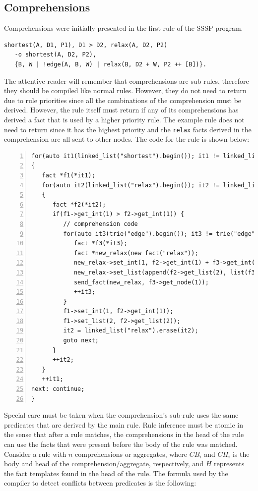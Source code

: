 \subsection{Comprehensions}

Comprehensions were initially presented in the first rule of the SSSP program.

\begin{Verbatim}
shortest(A, D1, P1), D1 > D2, relax(A, D2, P2)
   -o shortest(A, D2, P2),
   {B, W | !edge(A, B, W) | relax(B, D2 + W, P2 ++ [B])}.
\end{Verbatim}

The attentive reader will remember that comprehensions are sub-rules, therefore
they should be compiled like normal rules. However, they do not need to return
due to rule priorities since all the combinations of the comprehension must be
derived. However, the rule itself must return if any of its comprehensions
has derived a fact that is used by a higher priority rule.
The example rule does not need to return since it has the highest priority and the
\texttt{relax} facts derived in the comprehension are all sent to other nodes.
The code for the rule is shown below:

\begin{Verbatim}[numbers=left,fontsize=\scriptsize]
for(auto it1(linked_list("shortest").begin()); it1 != linked_list("shortest").end(); )
{
   fact *f1(*it1);
   for(auto it2(linked_list("relax").begin()); it2 != linked_list("relax").end(); )
   {
      fact *f2(*it2);
      if(f1->get_int(1) > f2->get_int(1)) {
         // comprehension code
         for(auto it3(trie("edge").begin()); it3 != trie("edge").end(); ) {
            fact *f3(*it3);
            fact *new_relax(new fact("relax"));
            new_relax->set_int(1, f2->get_int(1) + f3->get_int(2));
            new_relax->set_list(append(f2->get_list(2), list(f3->get_node(1))));
            send_fact(new_relax, f3->get_node(1));
            ++it3;
         }
         f1->set_int(1, f2->get_int(1));
         f1->set_list(2, f2->get_list(2));
         it2 = linked_list("relax").erase(it2);
         goto next;
      }
      ++it2;
   }
   ++it1;
next: continue;
}
\end{Verbatim}

Special care must be taken when the comprehension's sub-rule uses the same
predicates that are derived by the main rule.
Rule inference must be atomic in the sense that after a rule matches, the
comprehensions in the head of the rule can use the facts that were present
before the body of the rule was matched.
Consider a rule with $n$ comprehensions or aggregates, where $CB_i$ and $CH_i$
is the body and head of the comprehension/aggregate, respectively, and $H$
represents the fact templates found in the head of the rule.
The formula used by the compiler to detect conflicts between predicates is the
following:

